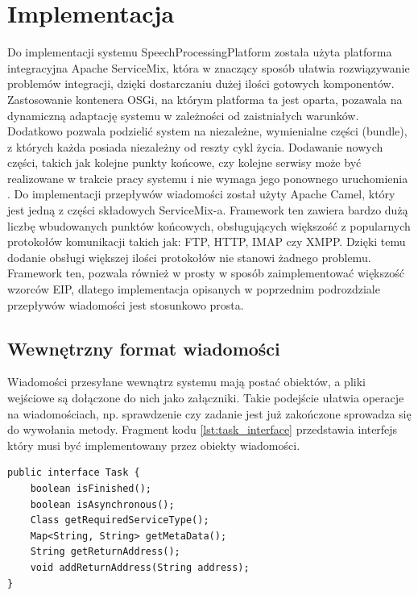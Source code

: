 \section{Implementacja}

Do implementacji systemu SpeechProcessingPlatform została użyta platforma integracyjna Apache ServiceMix, która w znaczący sposób ułatwia rozwiązywanie problemów integracji, dzięki dostarczaniu dużej ilości gotowych komponentów. Zastosowanie kontenera OSGi, na którym platforma ta jest oparta, pozawala na dynamiczną adaptację systemu w zależności od zaistniałych warunków. Dodatkowo pozwala podzielić system na niezależne, wymienialne części (bundle), z których każda posiada niezależny od reszty cykl życia. Dodawanie nowych części, takich jak kolejne punkty końcowe, czy kolejne serwisy może być realizowane w trakcie pracy systemu i nie wymaga jego ponownego uruchomienia \cite{hall2011}. 
Do implementacji przepływów wiadomości został użyty Apache Camel, który jest jedną z części składowych ServiceMix-a. Framework ten zawiera bardzo dużą liczbę wbudowanych punktów końcowych, obsługujących większość z popularnych protokołów komunikacji takich jak: FTP, HTTP, IMAP czy XMPP. Dzięki temu dodanie obsługi większej ilości protokołów nie stanowi żadnego problemu. Framework ten, pozwala również w prosty w sposób zaimplementować większość wzorców EIP, dlatego implementacja opisanych w poprzednim podrozdziale przepływów wiadomości jest stosunkowo prosta.

\subsection{Wewnętrzny format wiadomości}
Wiadomości przesyłane wewnątrz systemu mają postać obiektów, a pliki wejściowe są dołączone do nich jako załączniki. Takie podejście ułatwia operacje na wiadomościach, np. sprawdzenie czy zadanie jest już zakończone sprowadza się do wywołania metody. Fragment kodu \ref{lst:task_interface} przedstawia interfejs który musi być implementowany przez obiekty wiadomości.

\lstset{language=Java, tabsize=4, caption=Definicja interfejsu Task w języku Java.,label=lst:task_interface}

\begin{center}
\begin{lstlisting}
public interface Task {
	boolean isFinished();
	boolean isAsynchronous();
	Class getRequiredServiceType();
	Map<String, String> getMetaData();
	String getReturnAddress();
	void addReturnAddress(String address);
}
\end{lstlisting}
\end{center}

